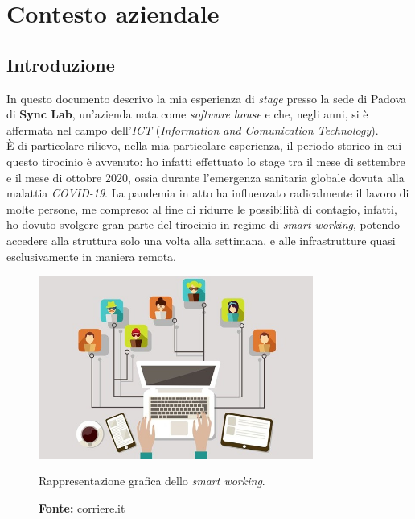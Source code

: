 
\chapter{Contesto aziendale}
\label{cap:contesto-aziendale}

%
%

\section{Introduzione}

In questo documento descrivo la mia esperienza di \textit{stage} presso la sede di Padova di \textbf{Sync Lab}, un'azienda nata come \textit{software house} e che, negli anni, si è affermata nel campo dell'\textit{ICT} (\textit{Information and Comunication Technology}).\\
È di particolare rilievo, nella mia particolare esperienza, il periodo storico in cui questo tirocinio è avvenuto: ho infatti effettuato lo stage tra il mese di settembre e il mese di ottobre 2020, ossia durante l'emergenza sanitaria globale dovuta alla malattia \textit{COVID-19}. La pandemia in atto ha influenzato radicalmente il lavoro di molte persone, me compreso: al fine di ridurre le possibilità di contagio, infatti, ho dovuto svolgere gran parte del tirocinio in regime di \textit{smart working}, potendo accedere alla struttura solo una volta alla settimana, e alle infrastrutture quasi esclusivamente in maniera remota.

\begin{figure}[htbp]
  \begin{center}
    \includegraphics[height=6cm]{immagini/smartworking}
  \end{center}
  \caption{Rappresentazione grafica dello \textit{smart working}.}
  \caption*{\textbf{Fonte:} corriere.it}
\end{figure}

